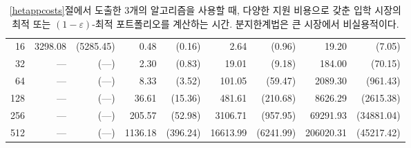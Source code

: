 \documentclass[11pt]{article} %
\newif\ifen
\theoremstyle{definition}
\theoremstyle{definition}
\begin{document}
\begin{table}[h!]
\begin{tabular}{r|r@{~}r|r@{~}r|r@{~}r|r@{~}r}
  16 &       3298.08 &    (5285.45) &         0.48 &      (0.16) &                2.64 &             (0.96) &                19.20 &              (7.05) \\
  32 &             — &          (—) &         2.30 &      (0.83) &               19.01 &             (9.18) &               184.00 &             (70.15) \\
  64 &             — &          (—) &         8.33 &      (3.52) &              101.05 &            (59.47) &              2089.30 &            (961.43) \\
 128 &             — &          (—) &        36.61 &     (15.36) &              481.61 &           (210.68) &              8626.29 &           (2615.38) \\
 256 &             — &          (—) &       205.57 &     (52.98) &             3106.71 &           (957.95) &             69291.93 &          (34881.04) \\
 512 &             — &          (—) &      1136.18 &    (396.24) &            16613.99 &          (6241.99) &            206020.31 &          (45217.42) 
\end{tabular}%
\caption{\label{experiment2results}
\ifen Time to compute an optimal or $(1 - \varepsilon)$-optimal portfolio for an admissions market with heterogeneous application costs using the three algorithms developed in section \ref{hetappcosts}.
The branch-and-bound algorithm is impractical for large markets. \lastptofcaption
\else  %
 \ref{hetappcosts}절에서 도출한 3개의 알고리즘을 사용할 때, 다양한 지원 비용으로 갖춘 입학 시장의 최적 또는 $(1- \varepsilon)$-최적 포트폴리오를 계산하는 시간. 분지한계법은 큰 시장에서 비실용적이다. \lastptofcaption \fi}
\end{table}
\end{document}
